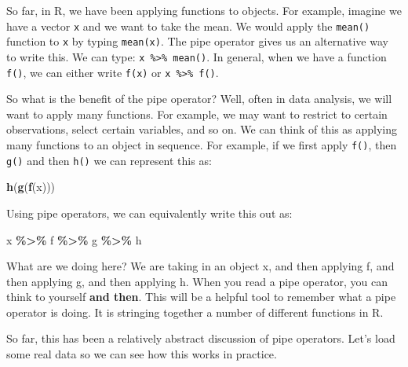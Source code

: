 \documentclass[
]{book}
\newenvironment{Shaded}{\begin{snugshade}}{\end{snugshade}}
\newcommand{\FunctionTok}[1]{\textcolor[rgb]{0.13,0.29,0.53}{\textbf{#1}}}
\newcommand{\NormalTok}[1]{#1}
\newcommand{\SpecialCharTok}[1]{\textcolor[rgb]{0.81,0.36,0.00}{\textbf{#1}}}
\begin{document}
So far, in R, we have been applying functions to objects. For example, imagine we have a vector \texttt{x} and we want to take the mean. We would apply the \texttt{mean()} function to \texttt{x} by typing \texttt{mean(x)}. The pipe operator gives us an alternative way to write this. We can type: \texttt{x\ \%\textgreater{}\%\ mean()}. In general, when we have a function \texttt{f()}, we can either write \texttt{f(x)} or \texttt{x\ \%\textgreater{}\%\ f()}.

So what is the benefit of the pipe operator? Well, often in data analysis, we will want to apply many functions. For example, we may want to restrict to certain observations, select certain variables, and so on. We can think of this as applying many functions to an object in sequence. For example, if we first apply \texttt{f()}, then \texttt{g()} and then \texttt{h()} we can represent this as:

\begin{Shaded}
\begin{Highlighting}[]
\FunctionTok{h}\NormalTok{(}\FunctionTok{g}\NormalTok{(}\FunctionTok{f}\NormalTok{(x)))}
\end{Highlighting}
\end{Shaded}

Using pipe operators, we can equivalently write this out as:

\begin{Shaded}
\begin{Highlighting}[]
\NormalTok{x }\SpecialCharTok{\%\textgreater{}\%} 
\NormalTok{  f }\SpecialCharTok{\%\textgreater{}\%}
\NormalTok{    g }\SpecialCharTok{\%\textgreater{}\%}
\NormalTok{      h}
\end{Highlighting}
\end{Shaded}

What are we doing here? We are taking in an object x, and then applying f, and then applying g, and then applying h. When you read a pipe operator, you can think to yourself \textbf{and then}. This will be a helpful tool to remember what a pipe operator is doing. It is stringing together a number of different functions in R.

So far, this has been a relatively abstract discussion of pipe operators. Let's load some real data so we can see how this works in practice.
\end{document}
